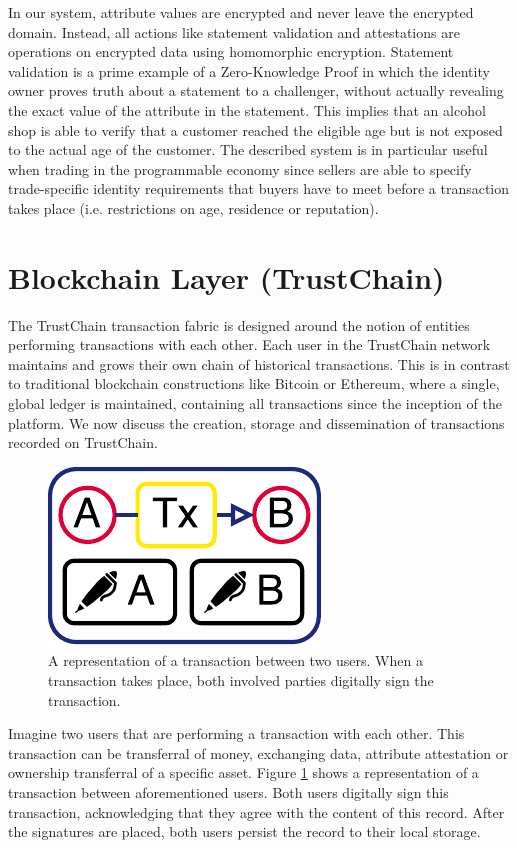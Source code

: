 \documentclass[USenglish]{article}
\begin{document}
In our system, attribute values are encrypted and never leave the encrypted domain.
Instead, all actions like statement validation and attestations are operations on encrypted data using homomorphic encryption.
Statement validation is a prime example of a Zero-Knowledge Proof in which the identity owner proves truth about a statement to a challenger, without actually revealing the exact value of the attribute in the statement.
This implies that an alcohol shop is able to verify that a customer reached the eligible age but is not exposed to the actual age of the customer.
The described system is in particular useful when trading in the programmable economy since sellers are able to specify trade-specific identity requirements that buyers have to meet before a transaction takes place (i.e. restrictions on age, residence or reputation).

\section{Blockchain Layer (TrustChain)}
\label{sec:trustchain}
The TrustChain transaction fabric is designed around the notion of entities performing transactions with each other.
Each user in the TrustChain network maintains and grows their own chain of historical transactions. 
This is in contrast to traditional blockchain constructions like Bitcoin or Ethereum, where a single, global ledger is maintained, containing all transactions since the inception of the platform.
We now discuss the creation, storage and dissemination of transactions recorded on TrustChain.

\begin{figure}[h!]
	\centering
	\includegraphics[width=0.3\columnwidth]{assets/trustchain_tutorial_1}
	\caption{A representation of a transaction between two users. When a transaction takes place, both involved parties digitally sign the transaction.}
	\label{fig:trustchain_tutorial_1}
\end{figure}

Imagine two users that are performing a transaction with each other.
This transaction can be transferral of money, exchanging data, attribute attestation or ownership transferral of a specific asset.
Figure \ref{fig:trustchain_tutorial_1} shows a representation of a transaction between aforementioned users.
Both users digitally sign this transaction, acknowledging that they agree with the content of this record.
After the signatures are placed, both users persist the record to their local storage.
\end{document}
